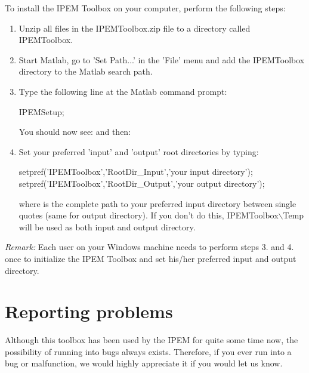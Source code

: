 \hypertarget{ReferenceManual:Installation}{}

To install the IPEM Toolbox on your computer, perform the
following steps:
\begin{enumerate}
    \item Unzip all files in the IPEMToolbox.zip file to a directory called IPEMToolbox.
    \item Start Matlab, go to 'Set Path...' in the 'File' menu and add the
    IPEMToolbox directory to the Matlab search path.
    \item Type the following line at the Matlab command prompt: \newline
    \begin{IPEMCodeEnvironment}
    IPEMSetup;
    \end{IPEMCodeEnvironment} \newline
    You should now see:  and then:
    \item Set your preferred 'input' and 'output' root directories by typing: \newline
    \begin{IPEMCodeEnvironment}
    setpref('IPEMToolbox','RootDir\_Input','your input directory'); \newline
    setpref('IPEMToolbox','RootDir\_Output','your output directory'); \newline
    \end{IPEMCodeEnvironment}
    where  is the complete path to your preferred
    input directory between single quotes (same for output directory). \newline
    If you don't do this, IPEMToolbox$\backslash$Temp will be used as both input and output
    directory.
\end{enumerate}

\textsl{Remark:} Each user on your Windows machine needs to perform steps 3. and
4. once to initialize the IPEM Toolbox and set his/her preferred
input and output directory.


\section{Reporting problems}

Although this toolbox has been used by the IPEM for quite some
time now, the possibility of running into bugs always exists.
Therefore, if you ever run into a bug or malfunction, we would
highly appreciate it if you would let us know.\\

